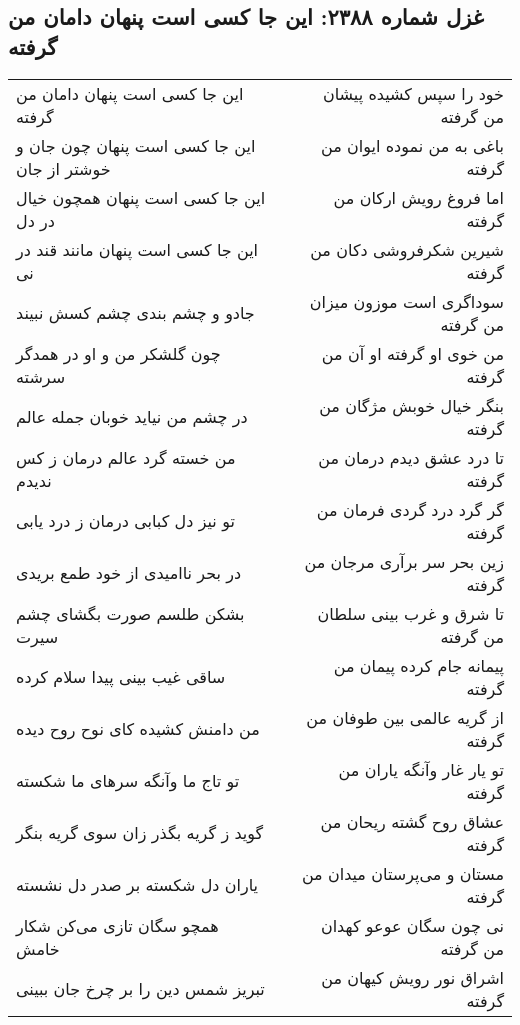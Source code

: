 \begin{center}
\section*{غزل شماره ۲۳۸۸: این جا کسی است پنهان دامان من گرفته}
\label{sec:2388}
\begin{longtable}{l p{0.5cm} r}
این جا کسی است پنهان دامان من گرفته
&&
خود را سپس کشیده پیشان من گرفته
\\
این جا کسی است پنهان چون جان و خوشتر از جان
&&
باغی به من نموده ایوان من گرفته
\\
این جا کسی است پنهان همچون خیال در دل
&&
اما فروغ رویش ارکان من گرفته
\\
این جا کسی است پنهان مانند قند در نی
&&
شیرین شکرفروشی دکان من گرفته
\\
جادو و چشم بندی چشم کسش نبیند
&&
سوداگری است موزون میزان من گرفته
\\
چون گلشکر من و او در همدگر سرشته
&&
من خوی او گرفته او آن من گرفته
\\
در چشم من نیاید خوبان جمله عالم
&&
بنگر خیال خوبش مژگان من گرفته
\\
من خسته گرد عالم درمان ز کس ندیدم
&&
تا درد عشق دیدم درمان من گرفته
\\
تو نیز دل کبابی درمان ز درد یابی
&&
گر گرد درد گردی فرمان من گرفته
\\
در بحر ناامیدی از خود طمع بریدی
&&
زین بحر سر برآری مرجان من گرفته
\\
بشکن طلسم صورت بگشای چشم سیرت
&&
تا شرق و غرب بینی سلطان من گرفته
\\
ساقی غیب بینی پیدا سلام کرده
&&
پیمانه جام کرده پیمان من گرفته
\\
من دامنش کشیده کای نوح روح دیده
&&
از گریه عالمی بین طوفان من گرفته
\\
تو تاج ما وآنگه سرهای ما شکسته
&&
تو یار غار وآنگه یاران من گرفته
\\
گوید ز گریه بگذر زان سوی گریه بنگر
&&
عشاق روح گشته ریحان من گرفته
\\
یاران دل شکسته بر صدر دل نشسته
&&
مستان و می‌پرستان میدان من گرفته
\\
همچو سگان تازی می‌کن شکار خامش
&&
نی چون سگان عوعو کهدان من گرفته
\\
تبریز شمس دین را بر چرخ جان ببینی
&&
اشراق نور رویش کیهان من گرفته
\\
\end{longtable}
\end{center}
